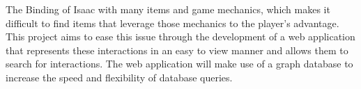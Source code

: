 The Binding of Isaac with many items and game mechanics, which makes it difficult to 
find items that leverage those mechanics to the player's advantage.
This project aims to ease this issue through the development of a web application that represents these 
interactions in an easy to view manner and allows them to search for interactions. The web application 
will make use of a graph database to increase the speed and flexibility of database queries.